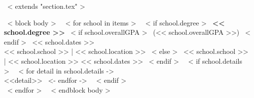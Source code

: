 ~< extends "section.tex" >~

~< block body >~
~< for school in items >~
  ~< if school.degree >~
    \textbf{<< school.degree >>}
    ~< if school.overallGPA >~
        (<< school.overallGPA >>)
    ~< endif >~
    \hfill << school.dates >> \\
    << school.school >> | << school.location >>
  ~< else >~
    << school.school >> | << school.location >> \hfill << school.dates >>
  ~< endif >~
  ~< if school.details >~
    ~< for detail in school.details ->~
        ~\\ <<detail>>
    ~<- endfor ->~
  ~< endif >~
  \vspace{3mm} \\
~< endfor >~
\vspace{-10mm}
~< endblock body >~
